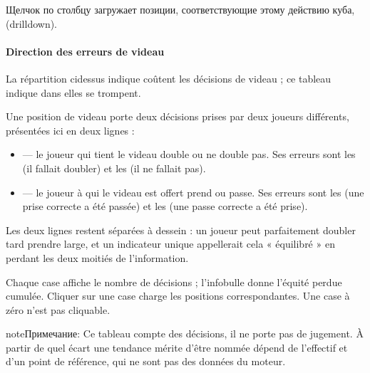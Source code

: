 \documentclass[letterpaper,10pt,russian]{sphinxmanual}
\begin{document}
\sphinxAtStartPar
Щелчок по столбцу загружает позиции, соответствующие этому действию куба,  (drill\sphinxhyphen{}down).


\paragraph{Direction des erreurs de videau}
\label{\detokenize{manuel:direction-des-erreurs-de-videau}}
\sphinxAtStartPar
La répartition ci\sphinxhyphen{}dessus indique  coûtent les décisions de videau ;
ce tableau indique dans  elles se trompent.

\sphinxAtStartPar
Une position de videau porte deux décisions prises par deux joueurs
différents, présentées ici en deux lignes :
\begin{itemize}
\item {} 
\sphinxAtStartPar
{} — le joueur qui tient le videau double ou ne double pas. Ses
erreurs sont les  (il fallait doubler) et les  (il ne fallait pas).

\item {} 
\sphinxAtStartPar
{} — le joueur à qui le videau est offert prend ou passe. Ses
erreurs sont les  (une prise correcte a été passée) et les
 (une passe correcte a été prise).

\end{itemize}

\sphinxAtStartPar
Les deux lignes restent séparées à dessein : un joueur peut parfaitement
doubler tard  prendre large, et un indicateur unique appellerait cela
« équilibré » en perdant les deux moitiés de l’information.

\sphinxAtStartPar
Chaque case affiche le nombre de décisions ; l’infobulle donne l’équité perdue
cumulée. Cliquer sur une case charge les positions correspondantes. Une case à
zéro n’est pas cliquable.

\begin{sphinxadmonition}{note}{Примечание:}
\sphinxAtStartPar
Ce tableau compte des décisions, il ne porte pas de jugement. À partir de
quel écart une tendance mérite d’être nommée dépend de l’effectif et d’un
point de référence, qui ne sont pas des données du moteur.
\end{sphinxadmonition}
\end{document}
